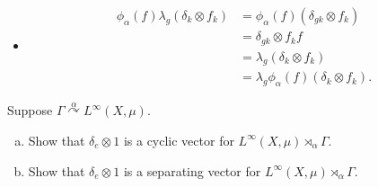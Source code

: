 \documentclass[10pt]{mypackage}
\begin{document}
\begin{solution}
\begin{itemize}
\begin{align*}
                                                                &= \rho_g\left( \delta_{k}\otimes \alpha_{k^{-1}}(f)f_k \right)\\
                                                                &= \rho_g\pi_{\alpha}(f)\left( \delta_k\otimes f_k \right).
      \end{align*}
    \item 
      \begin{align*}
        \phi_{\alpha}(f)\lambda_g\left( \delta_k\otimes f_k \right) &= \phi_{\alpha}(f)\left( \delta_{gk}\otimes f_k \right)\\
                                                                    &= \delta_{gk}\otimes f_kf\\
                                                                    &= \lambda_g\left( \delta_{k}\otimes f_k \right)\\
                                                                    &= \lambda_g\phi_{\alpha}(f)\left( \delta_k\otimes f_k \right).
      \end{align*}
  \end{itemize}
\end{solution}
\begin{problem}[Problem 3]
  Suppose $\Gamma\overset{\alpha}{\curvearrowright}L^{\infty}\left( X,\mu \right)$.
  \begin{enumerate}[(a)]
    \item Show that $\delta_e\otimes 1$ is a cyclic vector for $L^{\infty}\left( X,\mu \right)\rtimes_{\alpha}\Gamma$.
    \item Show that $\delta_e\otimes 1$ is a separating vector for $L^{\infty}\left( X,\mu \right)\rtimes_{\alpha}\Gamma$.
  \end{enumerate}
\end{problem}
\end{document}
